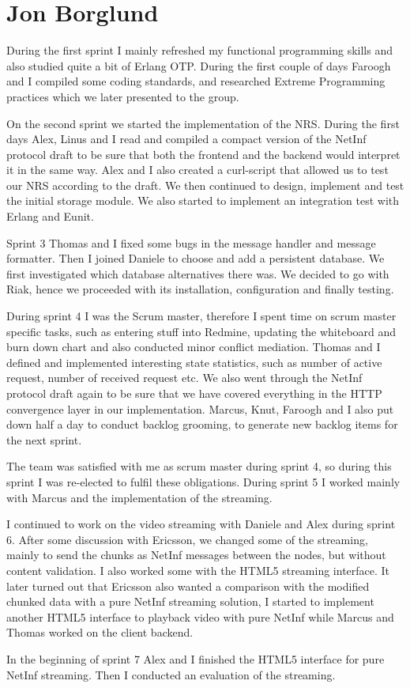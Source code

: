 \section{Jon Borglund}
During the first sprint I mainly refreshed my functional programming skills and also studied quite a bit of Erlang OTP.
During the first couple of days Faroogh and I compiled some coding standards, and researched Extreme Programming practices which we later presented to the group.

On the second sprint we started the implementation of the NRS. During the first days Alex, Linus and I read and compiled a compact version of the NetInf protocol draft to be sure that both the frontend and the backend would interpret it in the same way. Alex and I also created a curl-script that allowed us to test our NRS according to the draft. 
We then continued to design, implement and test the initial storage module. 
We also started to implement an integration test with Erlang and Eunit.

Sprint 3 Thomas and I fixed some bugs in the message handler and message formatter. Then I joined Daniele to choose and add a persistent database. We first investigated which database alternatives there was. We decided to go with Riak, hence we proceeded with its installation, configuration and finally testing.

During sprint 4 I was the Scrum master, therefore I spent time on scrum master specific tasks, such as entering stuff into Redmine, updating the whiteboard and burn down chart and also conducted minor conflict mediation. 
Thomas and I defined and implemented interesting state statistics, such as number of active request, number of received request etc. We also went through the NetInf protocol draft again to be sure that we have covered everything in the HTTP convergence layer in our implementation.  Marcus, Knut, Faroogh and I also put down half a day to conduct backlog grooming, to generate new backlog items for the next sprint. 

The team was satisfied with me as scrum master during sprint 4, so during this sprint I was re-elected to fulfil these obligations. 
During sprint 5 I worked mainly with Marcus and the implementation of the streaming. 

I continued to work on the video streaming with Daniele and Alex during sprint 6. After some discussion with Ericsson, we changed some of the streaming, mainly to send the chunks as NetInf messages between the nodes, but without content validation. I also worked some with the HTML5 streaming interface. 
It later turned out that Ericsson also wanted a comparison with the modified chunked data with a pure NetInf streaming solution, I started to implement another HTML5 interface to playback video with pure NetInf while Marcus and Thomas worked on the client backend.

In the beginning of sprint 7 Alex and I finished the HTML5 interface for pure NetInf streaming. Then I conducted an evaluation of the streaming. 